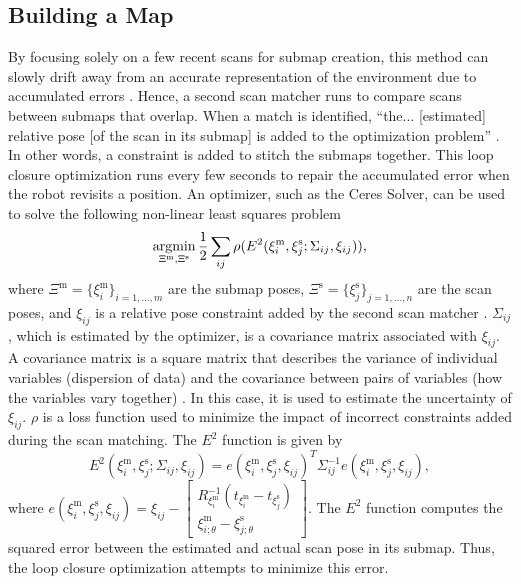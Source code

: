 \subsection{Building a Map} \label{map}
By focusing solely on a few recent scans for submap creation, this method can slowly drift away from an accurate representation of the environment due to accumulated errors \parencite{hessRealtimeLoopClosure2016}. Hence, a second scan matcher runs to compare scans between submaps that overlap. When a match is identified, ``the... [estimated] relative pose [of the scan in its submap] is added to the optimization problem'' \parencite{hessRealtimeLoopClosure2016}. In other words, a constraint is added to stitch the submaps together. This loop closure optimization runs every few seconds to repair the accumulated error when the robot revisits a position. An optimizer, such as the Ceres Solver, can be used to solve the following non-linear least squares problem
\[
    \operatorname*{argmin}_{\Xi^\text{m},\Xi^\text{s}} \frac{1}{2}\sum_{ij}\rho(E^2(\xi_i^\text{m},\xi_j^\text{s};\Sigma_{ij},\xi_{ij})),
\]
where $\Xi^\text{m}=\{\xi_i^\text{m}\}_{i=1,\ldots,m}$ are the submap poses, $\Xi^\text{s}=\{\xi_j^\text{s}\}_{j=1,\ldots,n}$ are the scan poses, and $\xi_{ij}$ is a relative pose constraint added by the second scan matcher \parencite{SolvingNonlinearLeast,hessRealtimeLoopClosure2016}. $\Sigma_{ij}$, which is estimated by the optimizer, is a covariance matrix associated with $\xi_{ij}$. A covariance matrix is a square matrix that describes the variance of individual variables (dispersion of data) and the covariance between pairs of variables (how the variables vary together) \parencite{CovarianceMatrixFormula}. In this case, it is used to estimate the uncertainty of $\xi_{ij}$. $\rho$ is a loss function used to minimize the impact of incorrect constraints added during the scan matching. The $E^2$ function is given by
\[
    E^2(\xi_i^\text{m},\xi_j^\text{s};\Sigma_{ij},\xi_{ij})=e(\xi_i^\text{m},\xi_j^\text{s},\xi_{ij})^T\Sigma_{ij}^{-1}e(\xi_i^\text{m},\xi_j^\text{s},\xi_{ij}),
\]
where $e(\xi_i^\text{m},\xi_j^\text{s},\xi_{ij})=\xi_{ij}-\begin{bmatrix}
        R_{\xi_i^\text{m}}^{-1}(t_{\xi_i^\text{m}}-t_{\xi_j^\text{s}}) \\
        \xi_{i;\theta}^\text{m}-\xi_{j;\theta}^\text{s}
    \end{bmatrix}$. The $E^2$ function computes the squared error between the estimated and actual scan pose in its submap. Thus, the loop closure optimization attempts to minimize this error.